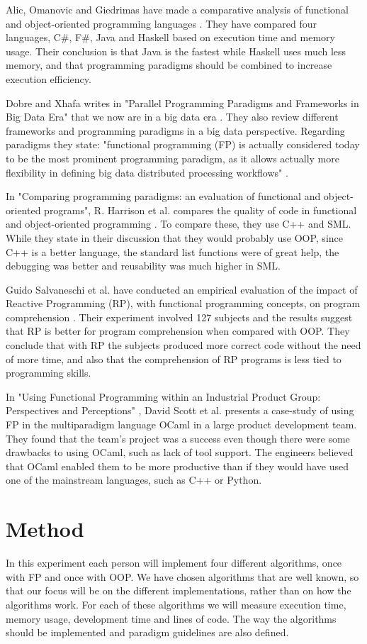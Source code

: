 \documentclass {article}
\begin{document}
Alic, Omanovic and Giedrimas have made a comparative analysis of functional and object-oriented programming languages \cite{alomgi}. They have compared four languages, C\#, F\#, Java and Haskell based on execution time and memory usage. Their conclusion is that Java is the fastest while Haskell uses much less memory, and that programming paradigms should be combined to increase execution efficiency. 

Dobre and Xhafa writes in "Parallel Programming Paradigms and Frameworks in Big Data Era" that we now are in a big data era \cite{dobre}. They also review different frameworks and programming paradigms in a big data perspective. Regarding paradigms they state: "functional programming (FP)  is actually considered today to be the most prominent programming paradigm, as it allows actually more flexibility in defining big data distributed processing workflows" \cite{dobre}.

In "Comparing programming paradigms: an evaluation of functional and object-oriented programs", R. Harrison et al. compares the quality of code in functional and object-oriented programming \cite{hasmadole}. To compare these, they use C++ and SML. While they state in their discussion that they would probably use OOP, since C++ is a better language, the standard list functions were of great help, the debugging was better and reusability was much higher in SML.

Guido Salvaneschi et al. have conducted an empirical evaluation of the impact of Reactive Programming (RP), with functional programming concepts, on program comprehension \cite{saproamname}. Their experiment involved 127 subjects and the results suggest that RP is better for program comprehension when compared with OOP. They conclude that with RP the subjects produced more correct code without the need of more time, and also that the comprehension of RP programs is less tied to programming skills. 

In "Using Functional Programming within an Industrial Product Group: Perspectives and Perceptions" \cite{scomad}, David Scott et al. presents a case-study of using FP in the multiparadigm language OCaml in a large product development team. They found that the team's project was a success even though there were some drawbacks to using OCaml, such as lack of tool support. The engineers believed that OCaml enabled them to be more productive than if they would have used one of the mainstream languages, such as C++ or Python.
\section{Method}
In this experiment each person will implement four different algorithms, once with FP and once with OOP. We have chosen algorithms that are well known, so that our focus will be on the different implementations, rather than on how the algorithms work. For each of these algorithms we will measure execution time, memory usage, development time and lines of code. The way the algorithms should be implemented and paradigm guidelines are also defined.
\end{document}
